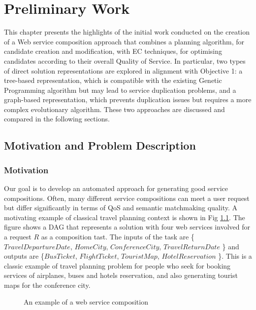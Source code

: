 \chapter{Preliminary Work}\label{C:preliminary}

This chapter presents the highlights of the initial work conducted on the creation of a Web service composition approach that combines a planning algorithm, for candidate creation and modification, with EC techniques, for optimising candidates according to their overall Quality of Service. In particular, two types of direct solution representations are explored in alignment with Objective 1: a tree-based representation, which is compatible with the existing Genetic Programming algorithm but may lead to service duplication problems, and a graph-based representation, which prevents duplication issues but requires a more complex evolutionary algorithm. These two approaches are discussed and compared in the following sections.


\section{Motivation and Problem Description}\label{Motivation and Problem Description}
\subsection{Motivation}\label{Motivation}

Our goal is to develop an automated approach for generating good service compositions. Often, many different service compositions can meet a user request but differ significantly in terms of QoS and semantic matchmaking quality. A motivating example of classical travel planning context is shown in Fig \ref{motivation}. The figure shows a DAG that represents a solution with four web services involved for a request $R$ as a composition tast. The inputs of the task are \{$TravelDepartureDate$, $HomeCity$, $ConferenceCity$, $TravelReturnDate$ \} and outputs are \{$BusTicket$, $FlightTicket$, $TouristMap$, $HotelReservation$ \}. This is a classic example of travel planning problem for people who seek for booking services of airplanes, buses and hotels reservation, and also generating tourist maps for the conference city.

\begin{figure}[h]
\centering
{}
 \caption{ An example of a web service composition}
 \label{motivation}
\end{figure}

